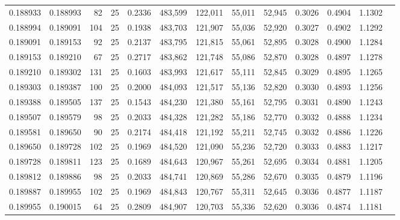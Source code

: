 \begin{tabular}{rrrrrrrrrrrrr}
0.188933 & 0.188993 &    82 &  25 &                                     0.2336 & 483,599 & 122,011 &  55,011 &  52,945 & 0.3026 & 0.4904 & 1.1302 \\
0.188994 & 0.189091 &   104 &  25 &                                     0.1938 & 483,703 & 121,907 &  55,036 &  52,920 & 0.3027 & 0.4902 & 1.1292 \\
0.189091 & 0.189153 &    92 &  25 &                                     0.2137 & 483,795 & 121,815 &  55,061 &  52,895 & 0.3028 & 0.4900 & 1.1284 \\
0.189153 & 0.189210 &    67 &  25 &                                     0.2717 & 483,862 & 121,748 &  55,086 &  52,870 & 0.3028 & 0.4897 & 1.1278 \\
0.189210 & 0.189302 &   131 &  25 &                                     0.1603 & 483,993 & 121,617 &  55,111 &  52,845 & 0.3029 & 0.4895 & 1.1265 \\
0.189303 & 0.189387 &   100 &  25 &                                     0.2000 & 484,093 & 121,517 &  55,136 &  52,820 & 0.3030 & 0.4893 & 1.1256 \\
0.189388 & 0.189505 &   137 &  25 &                                     0.1543 & 484,230 & 121,380 &  55,161 &  52,795 & 0.3031 & 0.4890 & 1.1243 \\
0.189507 & 0.189579 &    98 &  25 &                                     0.2033 & 484,328 & 121,282 &  55,186 &  52,770 & 0.3032 & 0.4888 & 1.1234 \\
0.189581 & 0.189650 &    90 &  25 &                                     0.2174 & 484,418 & 121,192 &  55,211 &  52,745 & 0.3032 & 0.4886 & 1.1226 \\
0.189650 & 0.189728 &   102 &  25 &                                     0.1969 & 484,520 & 121,090 &  55,236 &  52,720 & 0.3033 & 0.4883 & 1.1217 \\
0.189728 & 0.189811 &   123 &  25 &                                     0.1689 & 484,643 & 120,967 &  55,261 &  52,695 & 0.3034 & 0.4881 & 1.1205 \\
0.189812 & 0.189886 &    98 &  25 &                                     0.2033 & 484,741 & 120,869 &  55,286 &  52,670 & 0.3035 & 0.4879 & 1.1196 \\
0.189887 & 0.189955 &   102 &  25 &                                     0.1969 & 484,843 & 120,767 &  55,311 &  52,645 & 0.3036 & 0.4877 & 1.1187 \\
0.189955 & 0.190015 &    64 &  25 &                                     0.2809 & 484,907 & 120,703 &  55,336 &  52,620 & 0.3036 & 0.4874 & 1.1181 \\

\end{tabular}
